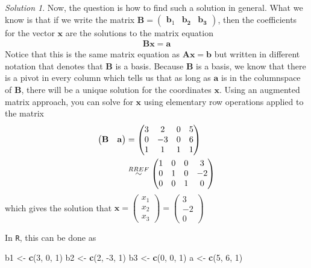 \documentclass[
]{book}
\newenvironment{Shaded}{\begin{snugshade}}{\end{snugshade}}
\newcommand{\DecValTok}[1]{\textcolor[rgb]{0.00,0.00,0.81}{#1}}
\newcommand{\KeywordTok}[1]{\textcolor[rgb]{0.13,0.29,0.53}{\textbf{#1}}}
\newcommand{\NormalTok}[1]{#1}
\newcommand{\StringTok}[1]{\textcolor[rgb]{0.31,0.60,0.02}{#1}}
\theoremstyle{definition}
\theoremstyle{definition}
\theoremstyle{definition}
\theoremstyle{definition}
\theoremstyle{remark}
\newtheorem*{solution}{Solution}
\begin{document}
\begin{solution}
Now, the question is how to find such a solution in general. What we know is that if we write the matrix \(\mathbf{B} = \begin{pmatrix} \mathbf{b}_1 & \mathbf{b_2} & \mathbf{b_3} \end{pmatrix}\), then the coefficients for the vector \(\mathbf{x}\) are the solutions to the matrix equation
\[
\begin{aligned}
\mathbf{B} \mathbf{x} = \mathbf{a}
\end{aligned}
\]
Notice that this is the same matrix equation as \(\mathbf{A} \mathbf{x} = \mathbf{b}\) but written in different notation that denotes that \(\mathbf{B}\) is a basis. Because \(\mathbf{B}\) is a basis, we know that there is a pivot in every column which tells us that as long as \(\mathbf{a}\) is in the columnspace of \(\mathbf{B}\), there will be a unique solution for the coordinates \(\mathbf{x}\). Using an augmented matrix approach, you can solve for \(\mathbf{x}\) using elementary row operations applied to the matrix
\[
\begin{aligned}
\begin{pmatrix} \mathbf{B} & \mathbf{a} \end{pmatrix} & = \begin{pmatrix} 3 & 2 & 0 & 5 \\ 0 & -3 & 0 & 6 \\ 1 & 1 & 1 & 1 \end{pmatrix} \\
& \stackrel{RREF}{\huge \sim} \begin{pmatrix} 1 & 0 & 0 & 3 \\ 0 & 1 & 0 & -2 \\ 0 & 0 & 1 & 0 \end{pmatrix} 
\end{aligned}
\]
which gives the solution that \(\mathbf{x} = \begin{pmatrix} x_1 \\ x_ 2 \\ x_3 \end{pmatrix} = \begin{pmatrix} 3 \\ -2 \\ 0\end{pmatrix}\)

In \texttt{R}, this can be done as

\begin{Shaded}
\begin{Highlighting}[]
\NormalTok{b1 <-}\StringTok{ }\KeywordTok{c}\NormalTok{(}\DecValTok{3}\NormalTok{, }\DecValTok{0}\NormalTok{, }\DecValTok{1}\NormalTok{)}
\NormalTok{b2 <-}\StringTok{ }\KeywordTok{c}\NormalTok{(}\DecValTok{2}\NormalTok{, }\DecValTok{-3}\NormalTok{, }\DecValTok{1}\NormalTok{)}
\NormalTok{b3 <-}\StringTok{ }\KeywordTok{c}\NormalTok{(}\DecValTok{0}\NormalTok{, }\DecValTok{0}\NormalTok{, }\DecValTok{1}\NormalTok{)}
\NormalTok{a <-}\StringTok{ }\KeywordTok{c}\NormalTok{(}\DecValTok{5}\NormalTok{, }\DecValTok{6}\NormalTok{, }\DecValTok{1}\NormalTok{)}


\end{Highlighting}
\end{Shaded}
\end{solution}
\end{document}
